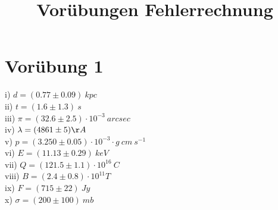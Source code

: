 \documentclass[titlepage]{scrartcl}
\begin{document}
\title{Vorübungen Fehlerrechnung}
\section{Vorübung 1}
i) $ d = (0.77 \pm 0.09)\ kpc $ \\
ii) $ t = (1.6 \pm 1.3) \ s $ \\
iii) $ \pi = (32.6 \pm 2.5) \cdot 10^{-3} \ arcsec $ \\
iv) $ \lambda = (4861 \pm 5) \AA $ \\
v) $ p = (3.250 \pm 0.05)\cdot  10^{-3} \cdot  g\ cm\ s^{-1} $ \\
vi) $ E = (11.13 \pm 0.29) \  keV $ \\
vii) $ Q = (121.5 \pm 1.1) \cdot 10^{16} \ C $ \\
viii) $ B = (2.4 \pm 0.8)  \cdot 10^{11} T $ \\
ix) $ F = (715 \pm 22)\ Jy $ \\
x) $ \sigma = (200 \pm 100)\ mb $ 
\end{document}
